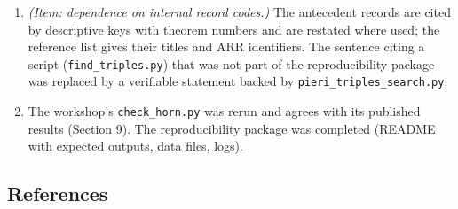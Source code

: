\documentclass[
  11pt,
  a4paper,
]{article}
\begin{document}
\begin{enumerate}
  parenthetical in the proof of (1)--(2) was removed, and the
  exhaustiveness of cases (2)/(3) is stated. A new exact-arithmetic
  script ({\small\texttt{coverage\_\allowbreak{}exact.\allowbreak{}py}}) checks all these statements on a
  fine rational grid with all ties and boundaries for \(m\le10\).
\item
  \emph{(Item: dependence on internal record codes.)} The antecedent
  records are cited by descriptive keys with theorem numbers and are
  restated where used; the reference list gives their titles and ARR
  identifiers. The sentence citing a script ({\small\texttt{find\_\allowbreak{}triples.\allowbreak{}py}})
  that was not part of the reproducibility package was replaced by a
  verifiable statement backed by {\small\texttt{pieri\_\allowbreak{}triples\_\allowbreak{}search.\allowbreak{}py}}.
\item
  The workshop's {\small\texttt{check\_\allowbreak{}horn.\allowbreak{}py}} was rerun and agrees with its
  published results (Section 9). The reproducibility package was
  completed (README with expected outputs, data files, logs).
\end{enumerate}

\subsection{References}\label{references}
\end{document}
